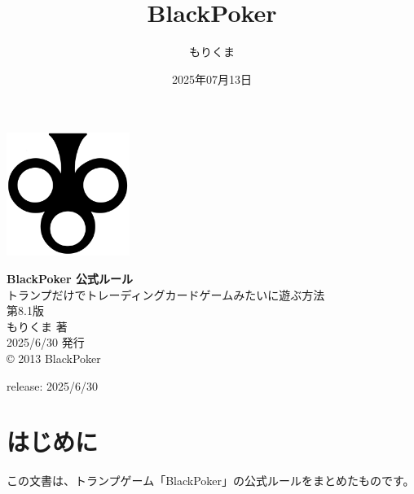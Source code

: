 \documentclass[letterpaper,10pt,dvipdfmx]{sphinxmanual}
\title{BlackPoker}
\date{2025年07月13日}
\author{もりくま}
\begin{document}
\pagestyle{empty}

\begin{titlepage}
\begin{center}
\vspace*{25mm}

\includegraphics[width=4cm]{blackpoker_logo.pdf}  %

\vspace{20mm}
{\Huge \textbf{BlackPoker 公式ルール}}\\[10mm]
{\Large トランプだけでトレーディングカードゲームみたいに遊ぶ方法}\\[30mm]

{\huge 第8.1版}\\[20mm]

{\Large もりくま 著} \\[5mm]
{\Large 2025/6/30 発行}\\[10mm]

{\small © 2013 BlackPoker}

\end{center}
\end{titlepage}

\clearpage
\thispagestyle{empty}  %
\null                  %
\clearpage             %

\pagestyle{plain}
\sphinxtableofcontents
\pagestyle{normal}
\label{\detokenize{index::doc}}


\sphinxAtStartPar
release: 2025/6/30

\sphinxstepscope


\chapter{はじめに}
\label{\detokenize{init/init:init-rst}}\label{\detokenize{init/init:id1}}\label{\detokenize{init/init::doc}}
\sphinxAtStartPar
この文書は、トランプゲーム「BlackPoker」の公式ルールをまとめたものです。
\end{document}

